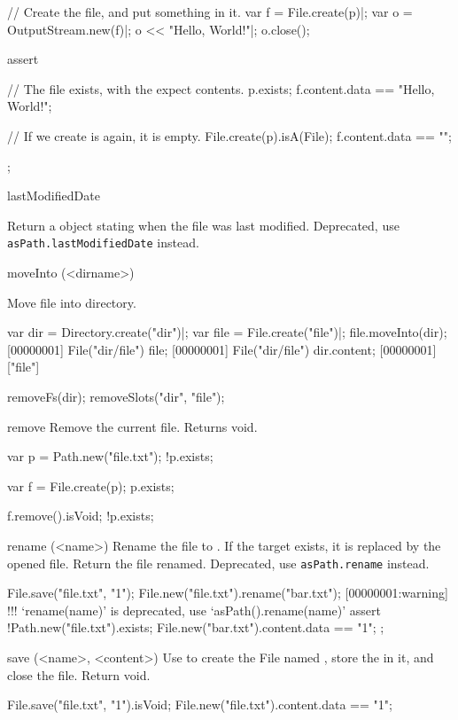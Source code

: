 \begin{urbiscriptapi}
\begin{urbiscript}
// Create the file, and put something in it.
var f = File.create(p)|;
var o = OutputStream.new(f)|;
o << "Hello, World!"|;
o.close();

assert
{
  // The file exists, with the expect contents.
  p.exists;
  f.content.data == "Hello, World!";

  // If we create is again, it is empty.
  File.create(p).isA(File);
  f.content.data == "";
};
\end{urbiscript}


\item[lastModifiedDate]
  \experimental{}

  Return a  object stating when the file was last modified.
  Deprecated, use \lstinline|asPath.lastModifiedDate| instead.


\item[moveInto](<dirname>)
  \experimental{}

  Move file into  directory.
\begin{urbiscript}
var dir = Directory.create("dir")|;
var file = File.create("file")|;
file.moveInto(dir);
[00000001] File("dir/file")
file;
[00000001] File("dir/file")
dir.content;
[00000001] ["file"]
\end{urbiscript}
\begin{urbicomment}
removeFs(dir);
removeSlots("dir", "file");
\end{urbicomment}


\item[remove]%
  Remove the current file.  Returns void.
\begin{urbiassert}[firstnumber=1]
var p = Path.new("file.txt");
!p.exists;

var f = File.create(p);
p.exists;

f.remove().isVoid;
!p.exists;
\end{urbiassert}


\item[rename](<name>)%
  Rename the file to .  If the target exists, it is replaced by
  the opened file. Return the file renamed.
  Deprecated, use \lstinline|asPath.rename| instead.
\begin{urbiscript}
File.save("file.txt", "1\n");
File.new("file.txt").rename("bar.txt");
[00000001:warning] !!! `rename(name)' is deprecated, use `asPath().rename(name)'
assert
{
  !Path.new("file.txt").exists;
  File.new("bar.txt").content.data == "1\n";
};
\end{urbiscript}


\item[save](<name>, <content>)
  Use  to create the File named , store the
   in it, and close the file.  Return void.
\begin{urbiassert}
File.save("file.txt", "1\n").isVoid;
File.new("file.txt").content.data == "1\n";
\end{urbiassert}



\end{urbiscriptapi}
